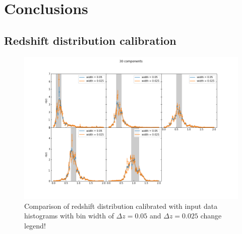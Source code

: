 \documentclass{aa}
\begin{document}
\section{Conclusions}
\label{sec:discussion}
  
\begin{acknowledgements}
  
\end{acknowledgements}






\begin{appendix} 
\section{Redshift distribution calibration}
\label{ap:calibration}
\begin{figure}
\label{fig:120vs240}
\centering
\includegraphics[scale=0.3]{plots/30.png}
\caption{Comparison of redshift distribution calibrated with input data histograms with bin width of $\Delta z = 0.05$ and $\Delta z = 0.025$ {\color{red} change legend!}}
\label{fig:comb}
\end{figure}
\begin{table}

\end{table}
\end{appendix}
\end{document}
